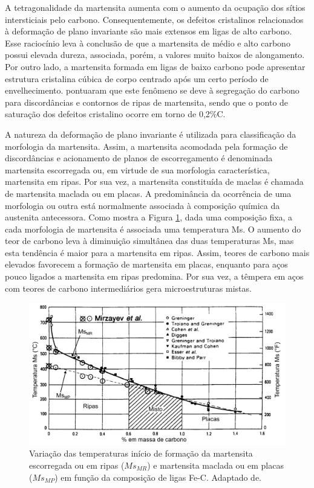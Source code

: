 A tetragonalidade da martensita aumenta com o aumento da ocupação dos sítios intersticiais pelo carbono. Consequentemente, os defeitos cristalinos relacionados à deformação de plano invariante são mais extensos em ligas de alto carbono. Esse raciocínio leva à conclusão de que a martensita de médio e alto carbono possui elevada dureza, associada, porém, a valores muito baixos de alongamento. Por outro lado, a martensita formada em ligas de baixo carbono pode apresentar estrutura cristalina cúbica de corpo centrado após um certo período de envelhecimento.  pontuaram que este fenômeno se deve à segregação do carbono para discordâncias e contornos de ripas de martensita, sendo que o ponto de saturação dos defeitos cristalino ocorre em torno de 0,2\%C.

A natureza da deformação de plano invariante é utilizada para classificação da morfologia da martensita. Assim, a martensita acomodada pela formação de discordâncias e acionamento de planos de escorregamento é denominada martensita escorregada ou, em virtude de sua morfologia característica, martensita em ripas. Por sua vez, a martensita constituída de maclas é chamada de martensita maclada ou em placas. A predominância da ocorrência de uma morfologia ou outra está normalmente associada à composição química da austenita antecessora. Como mostra a Figura \ref{fig:MsZhaoNotis}, dada uma composição fixa, a cada morfologia de martensita é associada uma temperatura Ms. O aumento do teor de carbono leva à diminuição simultânea das duas temperaturas Ms, mas esta tendência é maior para a martensita em ripas. Assim, teores de carbono mais elevados favorecem a formação de martensita em placas, enquanto para aços pouco ligados a martensita em ripas predomina. Por sua vez, a têmpera em aços com teores de carbono intermediários gera microestruturas mistas.

\begin{figure}
  \includegraphics[width=16cm]{img/Ms_Zhao.pdf}
  \caption{Variação das temperaturas início de formação da martensita escorregada ou em ripas ($Ms_{MR}$) e martensita maclada ou em placas ($Ms_{MP}$) em função da composição de ligas Fe-C. Adaptado de\cite{Zhao1995}.}
  \label{fig:MsZhaoNotis}
\end{figure}

